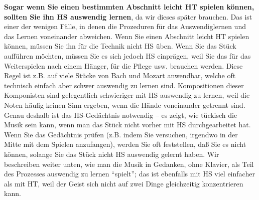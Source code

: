\textbf{Sogar wenn Sie einen bestimmten Abschnitt leicht HT spielen können, sollten Sie ihn HS auswendig lernen}, da wir dieses später brauchen.
Das ist einer der wenigen Fälle, in denen die Prozeduren für das Auswendiglernen und das Lernen voneinander abweichen.
Wenn Sie einen Abschnitt leicht HT spielen können, müssen Sie ihn für die Technik nicht HS üben.
Wenn Sie das Stück aufführen möchten, müssen Sie es sich jedoch HS einprägen, weil Sie das für das Weiterspielen nach einem Hänger, für die Pflege usw. brauchen werden.
Diese Regel ist z.B. auf viele Stücke von Bach und Mozart anwendbar, welche oft technisch einfach aber schwer auswendig zu lernen sind.
Kompositionen dieser Komponisten sind gelegentlich schwieriger mit HS auswendig zu lernen, weil die Noten häufig keinen Sinn ergeben, wenn die Hände voneinander getrennt sind.
Genau deshalb ist das HS-Gedächtnis notwendig -- es zeigt, wie tückisch die Musik sein kann, wenn man das Stück nicht vorher mit HS durchgearbeitet hat.
Wenn Sie das Gedächtnis prüfen (z.B. indem Sie versuchen, irgendwo in der Mitte mit dem Spielen anzufangen), werden Sie oft feststellen, daß Sie es nicht können, solange Sie das Stück nicht HS auswendig gelernt haben.
Wir beschreiben weiter unten, wie man die Musik in Gedanken, ohne Klavier, als Teil des Prozesses auswendig zu lernen \enquote{spielt}; das ist ebenfalls mit HS viel einfacher als mit HT, weil der Geist sich nicht auf zwei Dinge gleichzeitig konzentrieren kann.

